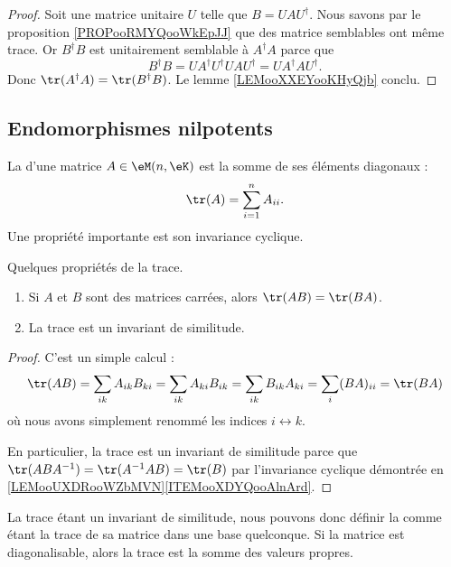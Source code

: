 \begin{proof}
    Soit une matrice unitaire \( U\) telle que \( B=UAU^{\dag}\). Nous savons par le proposition \ref{PROPooRMYQooWkEpJJ} que des matrice semblables ont même trace. Or \( B^{\dag}B\) est unitairement semblable à \( A^{\dag}A\) parce que
    \begin{equation}
        B^{\dag}B=UA^{\dag}U^{\dag}UAU^{\dag}=UA^{\dag}AU^{\dag}.
    \end{equation}
    Donc \( \tr(A^{\dag}A)=\tr(B^{\dag}B)\). Le lemme \ref{LEMooXXEYooKHyQjb} conclu.
\end{proof}

\subsection{Endomorphismes nilpotents}

La  d'une matrice \( A\in \eM(n,\eK)\) est la somme de ses éléments diagonaux :
\begin{equation}
	\tr(A)=\sum_{i=1}^nA_{ii}.
\end{equation}
Une propriété importante est son invariance cyclique.

\begin{lemma}   \label{LemhbZTay}
	Quelques propriétés de la trace.
	\begin{enumerate}
		\item
		      Si \( A\) et \( B\) sont des matrices carrées, alors \( \tr(AB)=\tr(BA)\).
		\item
		      La trace est un invariant de similitude.
	\end{enumerate}
\end{lemma}

\begin{proof}
	C'est un simple calcul :
	\begin{equation}
		\tr(AB)=\sum_{ik}A_{ik}B_{ki}
		=\sum_{ik}A_{ki}B_{ik}
		=\sum_{ik}B_{ik}A_{ki}
		=\sum_i(BA)_{ii}
		=\tr(BA)
	\end{equation}
	où nous avons simplement renommé les indices \( i\leftrightarrow k\).

	En particulier, la trace est un invariant de similitude parce que \( \tr(ABA^{-1})=\tr(A^{-1} AB)=\tr(B)\) par l'invariance cyclique démontrée en \ref{LEMooUXDRooWZbMVN}\ref{ITEMooXDYQooAlnArd}.
\end{proof}
La trace étant un invariant de similitude, nous pouvons donc définir la  comme étant la trace de sa matrice dans une base quelconque. Si la matrice est diagonalisable, alors la trace est la somme des valeurs propres.

